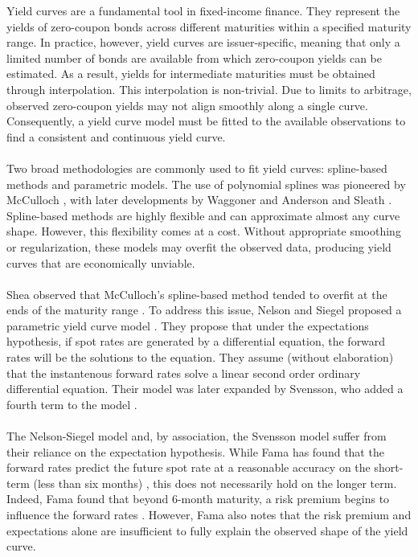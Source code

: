 \documentclass[a4paper]{artikel3}
\numberwithin{equation}{section}
\numberwithin{theorem}{section}
\numberwithin{proposition}{section}
\numberwithin{lemma}{section}
\begin{document}
Yield curves are a fundamental tool in fixed-income finance. They represent the yields of zero-coupon bonds across different maturities within a specified maturity range. In practice, however, yield curves are issuer-specific, meaning that only a limited number of bonds are available from which zero-coupon yields can be estimated. As a result, yields for intermediate maturities must be obtained through interpolation. This interpolation is non-trivial. Due to limits to arbitrage, observed zero-coupon yields may not align smoothly along a single curve. Consequently, a yield curve model must be fitted to the available observations to find a consistent and continuous yield curve. \\
\\
Two broad methodologies are commonly used to fit yield curves: spline-based methods and parametric models. The use of polynomial splines was pioneered by McCulloch \cite{mcculloch_1971}, with later developments by Waggoner \cite{waggoner_1997} and Anderson and Sleath \cite{anderson_sleath_1999}. Spline-based methods are highly flexible and can approximate almost any curve shape. However, this flexibility comes at a cost. Without appropriate smoothing or regularization, these models may overfit the observed data, producing yield curves that are economically unviable. \\
\\
Shea observed that McCulloch’s spline-based method tended to overfit at the ends of the maturity range \cite{shea_1984}. To address this issue, Nelson and Siegel proposed a parametric yield curve model \cite{nelson_siegel_1987}. They propose that under the expectations hypothesis, if spot rates are generated by a differential equation, the forward rates will be the solutions to the equation. They assume (without elaboration) that the instantenous forward rates solve a linear second order ordinary differential equation. Their model was later expanded by Svensson, who added a fourth term to the model \cite{svensson_1994}. \\
\\
The Nelson-Siegel model and, by association, the Svensson model suffer from their reliance on the expectation hypothesis. While Fama has found that the forward rates predict the future spot rate at a reasonable accuracy on the short-term (less than six months) \cite{fama_1984a}, this does not necessarily hold on the longer term. Indeed, Fama found that beyond 6-month maturity, a risk premium begins to influence the forward rates \cite{fama_1984b}. However, Fama also notes that the risk premium and expectations alone are insufficient to fully explain the observed shape of the yield curve. \\
\end{document}
